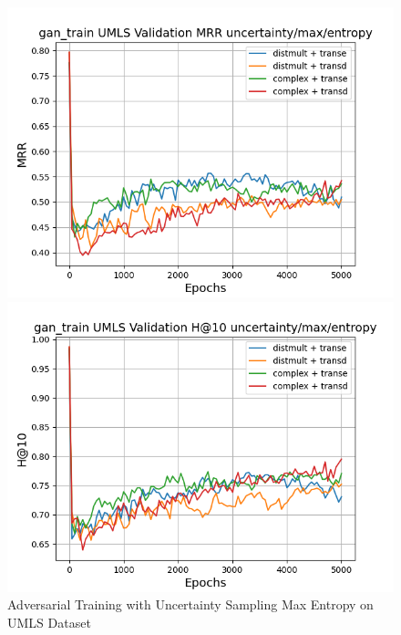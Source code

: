 \begin{figure}
\begin{minipage}{.5\textwidth}
      \includegraphics[width=0.9\linewidth]{figures/results/gan_train/pretrained/uncertainty/max/entropy/umls/gan_train_uncertainty_max_entropy_umls_mrrs.png}
    \end{minipage}%
    \begin{minipage}{.5\textwidth}
      \centering
      \includegraphics[width=0.9\linewidth]{figures/results/gan_train/pretrained/uncertainty/max/entropy/umls/gan_train_uncertainty_max_entropy_umls_hit10s.png}
    \end{minipage}%
    \caption{Adversarial Training with Uncertainty Sampling Max Entropy on \textsc{UMLS} Dataset}
    \label{fig:test}
\end{figure}


\pagebreak


